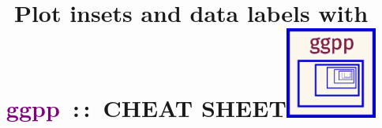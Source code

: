 \documentclass[DIV=21,a3,landscape,9pt]{scrartcl}\usepackage[]{graphicx}\usepackage[]{xcolor}
\begin{document}
\title{\huge Plot insets and data labels with \textcolor{purple}{ggpp}\ :\,:\ CHEAT SHEET\hfill\includegraphics[width=3cm]{logo-ggpp.png}}
\date{\null}



\maketitle\vspace{-20mm}
\end{document}
